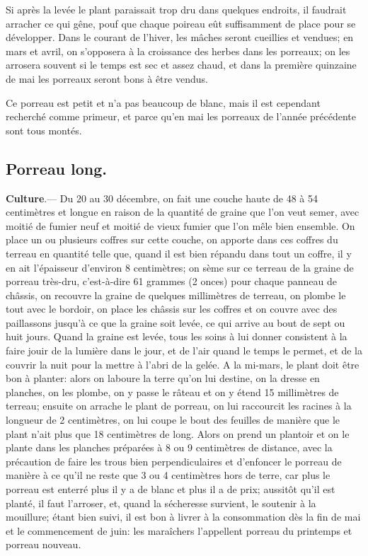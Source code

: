 \documentclass[10pt,a4paper]{book}
\begin{document}
Si après la levée le plant paraissait trop dru dans quelques endroits, il faudrait arracher ce qui gêne, pouf que chaque poireau eût suffisamment de place pour se développer. Dans le courant de l'hiver, les mâches seront cueillies et vendues; en mars et avril, on s'opposera à la croissance des herbes dans les porreaux; on les arrosera souvent si le temps est sec et assez chaud, et dans la première quinzaine de mai les porreaux seront bons à être vendus.

Ce porreau est petit et n'a pas beaucoup de blanc, mais il est cependant recherché comme primeur, et parce qu'en mai les porreaux de l'année précédente sont tous montés.

\subsection{Porreau long.}

\textbf{Culture}.--- Du 20 au 30 décembre, on fait une couche haute de 48 à 54 centimètres et longue en raison de la quantité de graine que l'on veut semer, avec moitié de fumier neuf et moitié de vieux fumier que l'on mêle bien ensemble. On place un ou plusieurs coffres sur cette couche, on apporte dans ces coffres du terreau en quantité telle que, quand il est bien répandu dans tout un coffre, il y en ait l'épaisseur d'environ 8 centimètres; on sème sur ce terreau de la graine de porreau très-dru, c'est-à-dire 61 grammes (2 onces) pour chaque panneau de châssis, on recouvre la graine de quelques millimètres de terreau, on plombe le tout avec le bordoir, on place les châssis sur les coffres et on couvre avec des paillassons jusqu'à ce que la graine soit levée, ce qui arrive au bout de sept ou huit jours. Quand la graine est levée, tous les soins à lui donner consistent à la faire jouir de la lumière dans le jour, et de l'air quand le temps le permet, et de la couvrir la nuit pour la mettre à l'abri de la gelée. A la mi-mars, le plant doit être bon à planter: alors on laboure la terre qu'on lui destine, on la dresse en planches, on les plombe, on y passe le râteau et on y étend 15 millimètres de terreau; ensuite on arrache le plant de porreau, on lui raccourcit les racines à la longueur de 2 centimètres, on lui coupe le bout des feuilles de manière que le plant n'ait plus que 18 centimètres de long. Alors on prend un plantoir et on le plante dans les planches préparées à 8 ou 9 centimètres de distance, avec la précaution de faire les trous bien perpendiculaires et d'enfoncer le porreau de manière à ce qu'il ne reste que 3 ou 4 centimètres hors de terre, car plus le porreau est enterré plus il y a de blanc et plus il a de prix; aussitôt qu'il est planté, il faut l'arroser, et, quand la sécheresse survient, le soutenir à la mouillure; étant bien suivi, il est bon à livrer à la consommation dès la fin de mai et le commencement de juin: les maraîchers l'appellent porreau du printemps et porreau nouveau.
\end{document}
